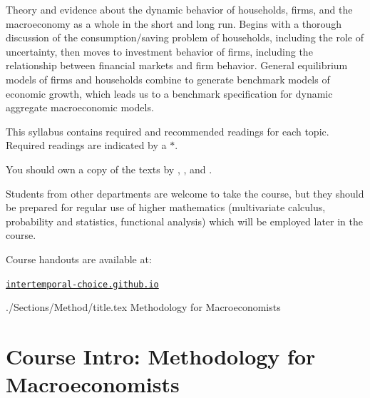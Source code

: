 \documentclass{\econtex}\newcommand{\texname}{Syllabus}
\begin{document}
\medskip\medskip

Theory and evidence about the dynamic behavior of households, firms, and the macroeconomy as a whole in the short and long run.  Begins with a thorough discussion of the consumption/saving problem of households, including the role of uncertainty, then moves to investment behavior of firms, including the relationship between financial markets and firm behavior.  General equilibrium models of firms and households combine to generate benchmark models of economic growth, which leads us to a benchmark specification for dynamic aggregate macroeconomic models.

This syllabus contains required and recommended readings for each
topic.  Required readings are indicated by a ${*}$. 

You should own a copy of the texts by \cite{blanchard&fischer:text}, \cite{deatonUnderstandingC}, 
\cite{romer:text} and \cite{lsRecurse}.

{\small Students from other departments are welcome to take the course, but 
they should be prepared for regular use of higher mathematics (multivariate
calculus, probability and statistics, functional analysis) which will be employed
later in the course.}

\medskip\medskip
\noindent Course handouts are available at: 
\medskip

\texttt{\href{https://intertemporal-choice.github.io}{intertemporal-choice.github.io}}

\pagebreak


\begin{verbatimwrite}{./Sections/Method/title.tex}
Methodology for Macroeconomists
\end{verbatimwrite}
\section{Course Intro: Methodology for Macroeconomists}
\end{document}
